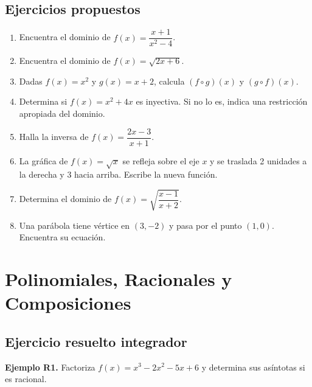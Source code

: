 \documentclass[12pt, letterpaper]{article}
\begin{document}
\subsection{Ejercicios propuestos}

\begin{enumerate}[resume=ejercicios, leftmargin=*]
  \item \facil{} Encuentra el dominio de $f(x) = \dfrac{x + 1}{x^2 - 4}$.

  \item \facil{} Encuentra el dominio de $f(x) = \sqrt{2x + 6}$.

  \item \facil{} Dadas $f(x) = x^2$ y $g(x) = x + 2$, calcula $(f \circ g)(x)$ y $(g \circ f)(x)$.

  \item \medio{} Determina si $f(x) = x^2 + 4x$ es inyectiva. Si no lo es, indica una restricción apropiada del dominio.

  \item \medio{} Halla la inversa de $f(x) = \dfrac{2x - 3}{x + 1}$.

  \item \medio{} La gráfica de $f(x) = \sqrt{x}$ se refleja sobre el eje $x$ y se traslada 2 unidades a la derecha y 3 hacia arriba. Escribe la nueva función.

  \item \dificil{} Determina el dominio de $f(x) = \sqrt{\dfrac{x - 1}{x + 2}}$.

  \item \dificil{} Una parábola tiene vértice en $(3, -2)$ y pasa por el punto $(1, 0)$. Encuentra su ecuación.
\end{enumerate}

\newpage

\section{Polinomiales, Racionales y Composiciones}

\subsection{Ejercicio resuelto integrador}

\textbf{Ejemplo R1.} Factoriza $f(x) = x^3 - 2x^2 - 5x + 6$ y determina sus asíntotas si es racional.
\end{document}
